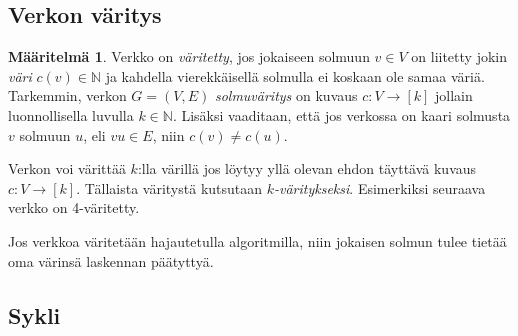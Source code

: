 \documentclass[finnish]{tktltiki2}
\theoremstyle{definition}
\newtheorem{maar}[lau]{Määritelmä}
\theoremstyle{remark}
\newcommand{\nat}{\mathbb{N}}
\newcommand{\from}{\colon}
\begin{document}
\subsection{Verkon väritys}

\begin{maar}
    Verkko on \emph{väritetty}, jos jokaiseen solmuun $v \in V$ on liitetty jokin
    \emph{väri} $c(v) \in \nat$ ja kahdella vierekkäisellä solmulla ei koskaan ole
    samaa väriä.  Tarkemmin, verkon $G = (V,E)$ \emph{solmuväritys} on kuvaus $c \from
    V \to [k]$ jollain luonnollisella luvulla $k \in \nat$.
    Lisäksi vaaditaan, että jos verkossa on kaari solmusta $v$ solmuun $u$, eli $vu
    \in E$, niin $c(v) \neq c(u)$.
\end{maar}

Verkon voi värittää $k$:lla värillä jos löytyy yllä olevan ehdon täyttävä
kuvaus $c \from V \to [k]$. Tällaista väritystä kutsutaan
\emph{$k$-väritykseksi}. Esimerkiksi seuraava verkko on 4-väritetty.


\begin{center}
\end{center}

Jos verkkoa väritetään hajautetulla algoritmilla, niin jokaisen solmun tulee
tietää oma värinsä laskennan päätyttyä.

\subsection{Sykli}
\end{document}
